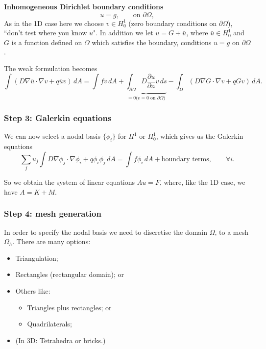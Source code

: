 \documentclass[12pt, a4paper]{article}
\theoremstyle{definition}
\theoremstyle{remark}
\numberwithin{equation}{section}
\begin{document}
 

{\bf Inhomogeneous Dirichlet boundary conditions}
\begin{equation*}
u=g, \qquad \mbox{on $\partial \Omega$},
\end{equation*}
As in the 1D case here we choose $v \in H^1_0$ (zero boundary conditions on $\partial\Omega$), ``don't test where you know $u$". 
In addition we let $u=G+\bar{u}$, where  $\bar{u} \in H^1_0$ and $G$ is a function defined on $\Omega$ which satisfies the boundary, conditions $u=g$ on  $\partial \Omega$. 

The weak formulation becomes
\begin{equation*}
\int (D\nabla \bar{u} \cdot \nabla v + q\bar{u}v)\, dA = \int fv\, dA + \underbrace{\int_{\partial \Omega} D \frac{\partial u}{\partial n}v \, ds}_{\mbox{$=0$($v=0$ on $\partial\Omega$)}} - \int_\Omega(D \nabla G \cdot \nabla v+qGv)\, dA.
\end{equation*}

\newpage
\subsubsection{Step 3: Galerkin equations}
We can now select a nodal basis $\{\phi_i\}$  for $H^1$ or $H^1_0$, which gives us the Galerkin equations
\begin{equation*}
\sum_j u_j\int D\nabla \phi_j \cdot \nabla \phi_i + q\phi_i\phi_j\, dA = \int f \phi_i \, dA + \mbox{boundary terms}, \qquad \forall i.
\end{equation*}

So we obtain the system of linear equations $Au=F$, where, like the 1D case, we have $A= K+M$.

\newpage

\subsubsection{Step 4: mesh generation}
In order to specify the nodal basis we need to discretise the domain $\Omega$, to a mesh $\Omega_{h}$.
There are many options:
\begin{itemize}
\item Triangulation;
\item Rectangles (rectangular domain); or
\item Others like:
\begin{itemize}
\item Triangles plus rectangles; or
\item Quadrilaterals;
\end{itemize}
\item (In 3D: Tetrahedra or bricks.)
\end{itemize}
\end{document}
